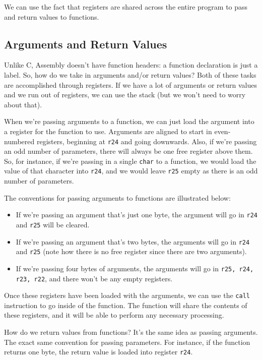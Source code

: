We can use the fact that registers are shared across the entire program to pass and return values to functions.

\subsection{Arguments and Return Values}

Unlike C, Assembly doesn't have function headers: a function declaration is just a label. So, how do we take in arguments and/or return values? Both of these tasks are accomplished through registers. If we have a lot of arguments or return values and we run out of registers, we can use the stack (but we won't need to worry about that). 



When we're passing arguments to a function, we can just load the argument into a register for the function to use. Arguments are aligned to start in even-numbered registers, beginning at \verb!r24! and going downwards. Also, if we're passing an odd number of parameters, there will always be one free register above them. So, for instance, if we're passing in a single \verb!char! to a function, we would load the value of that character into \verb!r24!, and we would leave \verb!r25! empty as there is an odd number of parameters.

The conventions for passing arguments to functions are illustrated below:
\begin{itemize}
    \item If we're passing an argument that's just one byte, the argument will go in \verb!r24! and \verb!r25! will be cleared.
    \item If we're passing an argument that's two bytes, the arguments will go in \verb!r24! and \verb!r25! (note how there is no free register since there are two arguments). 
    \item If we're passing four bytes of arguments, the arguments will go in \verb!r25, r24, r23, r22!, and there won't be any empty registers.  
\end{itemize} 

Once these registers have been loaded with the arguments, we can use the \verb!call! instruction to go inside of the function. The function will share the contents of these registers, and it will be able to perform any necessary processing. 



How do we return values from functions? It's the same idea as passing arguments. The exact same convention for passing parameters. For instance, if the function returns one byte, the return value is loaded into register \verb!r24!. 


